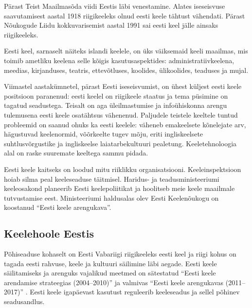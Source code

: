 \begin{multicols}{2}
Pärast Teist Maailmasõda viidi Eestis läbi venestamine. 
Alates iseseisvuse saavutamisest aastal 1918 riigikeeleks olnud eesti keele tähtust vähendati. 
Pärast Nõukogude Liidu kokkuvarisemist aastal 1991 sai eesti keel jälle ainsaks riigikeeleks.



Eesti keel, sarnaselt näiteks islandi keelele, on üks väiksemaid keeli maailmas, mis toimib ametliku keelena selle kõigis kasutusaspektides: administratiivkeelena, meedias, kirjanduses, teatris, ettevõtluses, koolides, ülikoolides, teaduses ja mujal.

Viimastel aastakümnetel, pärast Eesti ise\-seisvumist, on ühest küljest eesti keele positsioon paranenud: eesti keelel on riigi\-keele staatus ja tema püsimine on tagatud seadustega. 
Teisalt on aga üleilmastumise ja infoühiskonna arengu tulemusena eesti keele osatähtsus vähenenud. 
Paljudele teistele keeltele tuntud probleemid on saanud ohuks ka eesti keelele: väheneb emakeelsete kõnelejate arv, hägustuvad keelenormid, võõrkeelte tugev mõju, eriti ingliskeelsete suhtlusvõrgustike ja ingliskeelse laiatarbekultuuri pealetung. 
Keeletehnoloogia alal on raske suuremate keeltega sam\-mu pidada.

 
Eesti keele kaitseks on loodud mitu riiklikku organisatsiooni.
Keeleinspektsioon hoiab silma peal keeleseaduse täitmisel. 
Haridus- ja teadus\-ministeeriumi keeleosakond planee\-rib Eesti keelepoliitikat ja hoolitseb meie keele maailmale tutvustamise eest. 
Ministeeriumi haldusalas olev Eesti Keelenõu\-kogu on koostanud ``Eesti keele arengukava''.

\subsection{Keelehoole Eestis}

Põhiseaduse kohaselt on Eesti Vabariigi riigi\-keeleks eesti keel ja riigi kohus on tagada eesti rahvuse, keele ja kultuuri säili\-mine läbi aegade. 
Eesti keele säilitamiseks ja arenguks vajalikud meetmed on sätestatud
``Eesti keele arendamise strateegias (2004--2010)''
\cite{KeeleStratEst} ja valmivas ``Eesti keele arengukavas
(2011--2017)'' \cite{DevPlan}.  
Eesti keele igapäevast kasutust reguleerib keeleseadus ja sellel põhinev seadusandlus.


\end{multicols}
